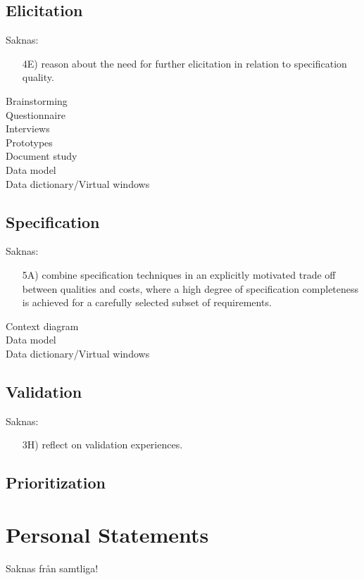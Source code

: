 \documentclass[10pt,a4paper]{article}
\begin{document}
\subsection{Elicitation}
{\Large Saknas:}
\begin{itemize}
\item[ 4E)] reason about the need for further elicitation in relation to specification quality.
\end{itemize}
\begin{description}
\item[Brainstorming] 
\item[Questionnaire]
\item[Interviews] 
\item[Prototypes] 
\item[Document study]
\item[Data model]
\item[Data dictionary/Virtual windows]
\end{description}

\subsection{Specification}
{\Large Saknas:}
\begin{itemize}
\item[5A)] combine specification techniques in an explicitly motivated trade off between qualities and costs, where a high degree of specification completeness is achieved for a carefully selected subset of requirements.
\end{itemize}

\begin{description}
\item[Context diagram]
\item[Data model]
\item[Data dictionary/Virtual windows]
\end{description}

\subsection{Validation}
{\Large Saknas:}
\begin{itemize}
\item[3H)] reflect on validation experiences.
\end{itemize}
\subsection{Prioritization}
\section{Personal Statements}
{\Large Saknas från samtliga!}
\end{document}
